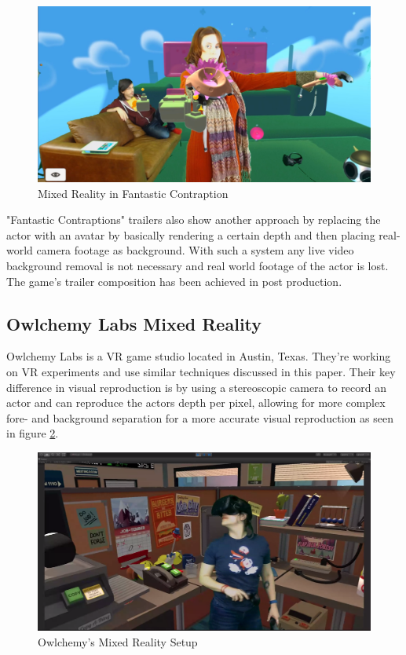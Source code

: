\begin{figure}[htb]
	\centering
	\includegraphics[width=\textwidth]{_external/media/fcontraption-mr.jpg}
	\caption{Mixed Reality in Fantastic 
	Contraption\cite{northway:fcontraption:2016}}
	\label{fig:mrproduction:fcontraption}
\end{figure}

"Fantastic Contraptions" trailers also show another approach by replacing the 
actor with an avatar by basically rendering a certain depth and then placing 
real-world camera footage as background. With such a system any live video 
background removal is not necessary and real world footage of the actor is 
lost. The game's trailer composition has been achieved in post production. 
\cite{gartner:cinematography:2017}

\subsection{Owlchemy Labs Mixed Reality}

Owlchemy Labs is a VR game studio located in Austin, Texas. They're working 
on VR experiments and use similar techniques discussed in this paper. Their key 
difference in visual reproduction is by using a stereoscopic camera to record 
an actor and can reproduce the actors depth per pixel, allowing for more 
complex fore- and background separation for a more accurate visual 
reproduction as seen in figure \ref{fig:mrproduction:owlchemy}.

\begin{figure}[htb]
	\centering
	\includegraphics[width=\textwidth]{_external/media/owlch-mr.png}
	\caption{Owlchemy's Mixed Reality Setup\cite{owlchemy:mr:3:2017}}
	\label{fig:mrproduction:owlchemy}
\end{figure}

